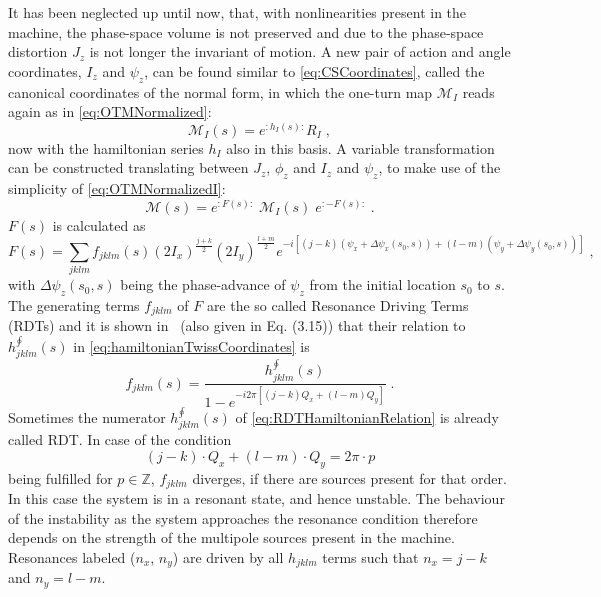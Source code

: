 It has been neglected up until now, that, with nonlinearities present in the machine,
the phase-space volume is not preserved and due to the phase-space distortion $J_z$ is not 
longer the invariant of motion.
A new pair of action and angle coordinates, $I_z$ and $\psi_z$,
can be found similar to \cref{eq:CSCoordinates}, called the canonical coordinates of the normal form,
in which the one-turn map $\mathcal{M}_I$ reads again as in \cref{eq:OTMNormalized}: 
\begin{equation}
    \label{eq:OTMNormalizedI}
    \mathcal{M}_I(s) = e^{:h_I(s):}R_I  \; ,
\end{equation}
now with the hamiltonian series $h_I$ also in this basis.
A variable transformation can be constructed 
translating between $J_z$, $\phi_z$ and $I_z$ and $\psi_z$, 
to make use of the simplicity of \cref{eq:OTMNormalizedI}:
\begin{equation}
    \label{eq:NormalFormTransformation}
    \mathcal{M}(s) = e^{:F(s):} \;  \mathcal{M}_I(s) \; e^{:-F(s):} \; .
\end{equation}
%
$F(s)$ is calculated as 
%
\begin{equation}
    \label{eq:NormalFormGeneratingFunction}
    F(s) = \sum\limits_{jklm} f_{jklm}(s) (2I_x)^{\frac{j+k}{2}}(2I_y)^{\frac{l+m}{2}} e^{-i\left[(j-k)(\psi_x + \Delta \psi_x(s_0, s)) + (l-m)(\psi_y + \Delta \psi_y(s_0, s))\right]} \; ,
\end{equation}
% 
with $\Delta \psi_z(s_0, s)$ being the phase-advance of $\psi_z$ from the initial location $s_0$ to $s$.
The generating terms $f_{jklm}$ of $F$ are the so called Resonance Driving Terms (RDTs) and it is shown 
in~\cite{ForestHamiltonianFreeDescription1990} (also given in \cite{FranchiStudiesMeasurementsLinear2006} Eq. (3.15)) 
that their relation to $h^{\oint}_{jklm}(s)$ in \cref{eq:hamiltonianTwissCoordinates} is
%
\begin{equation}
    \label{eq:RDTHamiltonianRelation}
    f_{jklm}(s) = 
    \frac{h^{\oint}_{jklm}(s)}{1 - e^{-i2\pi[(j-k)Q_x + (l-m)Q_y]}} \;.
\end{equation}
%
Sometimes the numerator $h^{\oint}_{jklm}(s)$ of \cref{eq:RDTHamiltonianRelation} is already called RDT.
In case of the condition 
%
\begin{equation}
    \label{eq:ResonanceCondition}
    (j-k) \cdot Q_x + (l-m) \cdot Q_y = 2\pi \cdot p 
\end{equation}
%
being fulfilled for $p \in \mathbb{Z}$, $f_{jklm}$ diverges, if there are sources present for that order.
In this case the system is in a resonant state, and hence unstable.
The behaviour of the instability as the system approaches the resonance condition therefore depends 
on the strength of the multipole sources present in the machine.
Resonances labeled ($n_x$, $n_y$) are driven by all $h_{jklm}$ terms such that $n_x = j-k$ and $n_y = l - m$.

